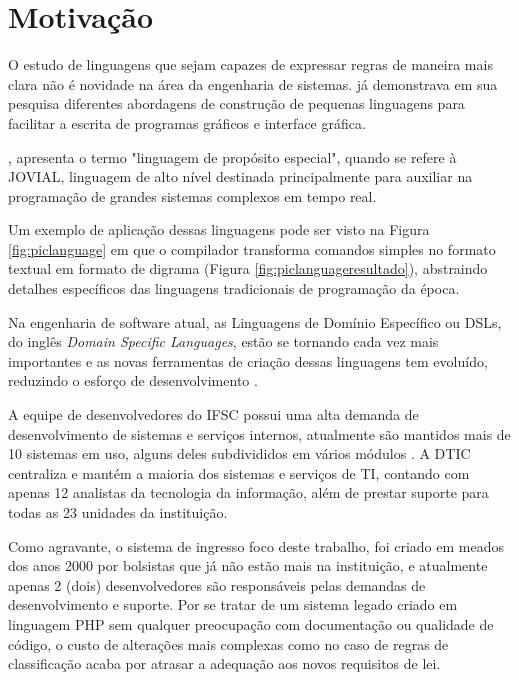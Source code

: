 \section{Motivação}
\label{motivacao}

O estudo de linguagens que sejam capazes de expressar regras de maneira mais clara não é novidade na área da engenharia de sistemas.  já demonstrava em sua pesquisa diferentes abordagens de construção de pequenas linguagens para facilitar a escrita de programas gráficos e interface gráfica.


, apresenta o termo "linguagem de propósito especial", quando se refere à \gls{JOVIAL}, linguagem de alto nível destinada principalmente para auxiliar na programação de grandes sistemas complexos em tempo real. 

Um exemplo de aplicação dessas linguagens pode ser visto na Figura \ref{fig:piclanguage} em que o compilador transforma comandos simples no formato textual em formato de digrama (Figura \ref{fig:piclanguageresultado}), abstraindo detalhes específicos das linguagens tradicionais de programação da época.





Na engenharia de software atual, as Linguagens de Domínio Específico ou DSLs, do inglês \textit{Domain Specific Languages}, estão se tornando cada vez mais importantes e as novas ferramentas de criação dessas linguagens tem evoluído, reduzindo o esforço de desenvolvimento \cite{dslengineering}.


A equipe de desenvolvedores do \gls{IFSC} possui uma alta demanda de desenvolvimento de sistemas e serviços internos, atualmente são mantidos mais de 10 sistemas em uso, alguns deles subdivididos em vários módulos \cite{catalogoifsc}. A \gls{DTIC} centraliza e mantém a maioria dos sistemas e serviços de TI, contando com apenas 12 analistas da tecnologia da informação, além de prestar suporte para todas as 23 unidades da instituição. 

Como agravante, o sistema de ingresso foco deste trabalho, foi criado em meados dos anos 2000 por bolsistas que já não estão mais na instituição, e atualmente apenas 2 (dois) desenvolvedores são responsáveis pelas demandas de desenvolvimento e suporte. Por se tratar de um sistema legado criado em linguagem PHP sem qualquer preocupação com documentação ou qualidade de código, o custo de alterações mais complexas como no caso de regras de classificação acaba por atrasar a adequação aos novos requisitos de lei. 

